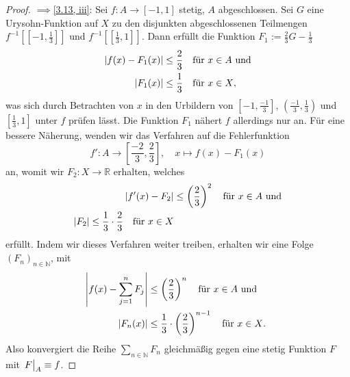 \documentclass[
12pt, 
openany, 
a4paper, 
final,
fleqn, 
]{myclass}
\numberwithin{equation}{chapter}
\numberwithin{section}{chapter}
\newcommand{\implication}[2]{\glqq {#1}$\implies${#2}\grqq}
\newcommand{\eval}[1]{\left. \vphantom{\int}#1\right\lvert}
\DeclarePairedDelimiter{\abs}{\lvert}{\rvert}
\newcommand{\todo}[1]{}
\begin{document}
\begin{proof}
\implication{\ref{3.13, ii}}{\ref{3.13, iii}}: Sei $ f:A\to [-1, 1] $ stetig, $ A $ abgeschlossen. Sei $ G $ eine Urysohn-Funktion auf $ X $ zu den disjunkten abgeschlossenen Teilmengen $ f^{-1}[[-1, \frac{1}{3}]] $ und $ f^{-1}[[\frac{1}{3}, 1]] $. Dann erfüllt die Funktion $ F_{1} := \frac{2}{3}G- \frac{1}{3} $
\begin{align*}
\abs{f(x)-F_{1}(x)} & \leq \frac{2}{3}\quad \text{für $ x\in A $ und}\\
\abs{F_{1}(x)} & \leq \frac{1}{3} \quad \text{für $ x\in X $}, 
\end{align*}
was sich durch Betrachten von $ x $ in den Urbildern von $ [-1, \frac{-1}{3}] $, $ (\frac{-1}{3},  \frac{1}{3}) $ und $ [\frac{1}{3}, 1] $ unter $ f $ prüfen lässt. Die Funktion $ F_{1} $ nähert $ f $ allerdings nur an. Für eine bessere Näherung, wenden wir das Verfahren auf die Fehlerfunktion
\[
f': A\to [\frac{-2}{3}, \frac{2}{3}], \quad x\mapsto f(x) - F_{1}(x)
\]
an, womit wir $ F_{2}:X\to\mathbb{R} $ erhalten, welches
\begin{align*}
\abs{f'(x)- F_{2}} & \leq \left(\frac{2}{3}\right)^{2} \quad \text{für $ x\in A $ und}\\
\abs{F_{2}} \leq \frac{1}{3}\cdot \frac{2}{3} \quad \text{für $ x\in X $}
\end{align*}
erfüllt. Indem wir dieses Verfahren weiter treiben, erhalten wir eine Folge $ (F_{n})_{n\in \mathbb{N}} $, mit
\begin{align*}
\abs*{f(x) - \sum_{j=1}^{n}F_{j}} &\leq \left(\frac{2}{3}\right)^{n} \quad \text{für $ x\in A $ und}\\
\abs{F_{n}(x)} & \leq \frac{1}{3}\cdot \left(\frac{2}{3}\right)^{n-1} \quad \text{für $ x\in X $. }
\end{align*}
Also konvergiert die Reihe $ \sum_{n\in \mathbb{N}}F_{n} $ gleichmäßig gegen eine stetig Funktion $ F $ mit $ \eval{F}_{A} \equiv f $. 
\todo{\implication{\ref{3.13, iii}}{\ref{3.13, i}}}
\end{proof}
\end{document}
